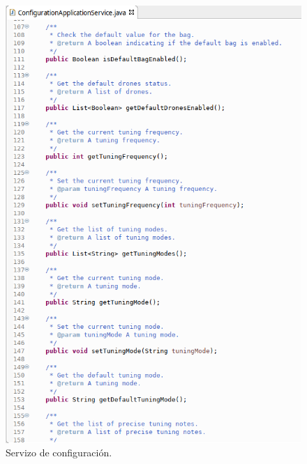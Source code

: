    \begin{figure}[htbp]
    \centering
    \includegraphics[scale=0.6, keepaspectratio=true]{./imagenes/servizo-configuracion-3.png}
    \caption{Servizo de configuración.}
    \label{figura:ServizoConfiguracion3}
   \end{figure}
   
